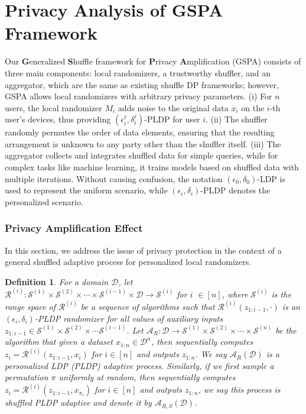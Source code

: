 \documentclass[letterpaper]{article} %
\newtheorem{definition}{Definition}
\begin{document}
\section{Privacy Analysis of GSPA Framework}
Our {\bf G}eneralized {\bf S}huffle framework for {\bf P}rivacy {\bf A}mplification (GSPA)
consists of three main components: local randomizers, a trustworthy shuffler, and an aggregator, which are the same as existing shuffle DP frameworks; however, GSPA allows local randomizers with arbitrary privacy parameters.
(i) For $n$ users, the local randomizer $M_i$ adds noise to the original data $x_i$ on the $i$-th user's devices, thus providing $(\epsilon^\ell_i,\delta^\ell_i)$-PLDP for user $i$. (ii) The shuffler randomly permutes the order of data elements, ensuring that the resulting arrangement is unknown to any party other than the shuffler itself. (iii) The aggregator collects and integrates shuffled data for simple queries, while for complex tasks like machine learning, it trains models based on shuffled data with multiple iterations.
Without causing confusion, the notation $(\epsilon_0, \delta_0)$-LDP is used to represent the uniform scenario, while $(\epsilon_i, \delta_i)$-PLDP denotes the personalized scenario.
\subsubsection*{Privacy Amplification Effect}
In this section, we address the issue of privacy protection in the context of a general shuffled adaptive process for personalized local randomizers.
\begin{definition}
For a domain $\mathcal{D}$, let $\mathcal{R}^{(i)}:\mathcal{S}^{(1)}\times \mathcal{S}^{(2)} \times \cdots \times \mathcal{S}^{(i-1)} \times \mathcal{D} \rightarrow \mathcal{S}^{(i)}$ for $i$ $\in [n]$, where $\mathcal{S}^{(i)}$ is the range space of $\mathcal{R}^{(i)}$ be a sequence of algorithms such that $\mathcal{R}^{(i)}(z_{1:i-1},\cdot)$ is an $(\epsilon_i,\delta_i)$-PLDP randomizer for all values of auxiliary inputs $z_{1:i-1} \in \mathcal{S}^{(1)} \times \mathcal{S}^{(2)} \times \cdots \mathcal{S}^{(i-1)}$. Let $\mathcal{A}_R: \mathcal{D} \rightarrow \mathcal{S}^{(1)} \times \mathcal{S}^{(2)} \times \cdots \times \mathcal{S}^{(n)}$ be the algorithm that given a dataset $x_{1:n} \in \mathcal{D}^n$, then sequentially computes $z_i = \mathcal{R}^{(i)}(z_{1:i-1},x_i)$ for $i \in [n]$ and outputs $z_{1:n}$. We say $\mathcal{A}_R(\mathcal{D})$ is a personalized LDP (PLDP) adaptive process. Similarly, if we first sample a permutation $\pi$ uniformly at random, then sequentially computes $z_i = \mathcal{R}^{(i)}(z_{1:i-1},x_{\pi_i})$ for $i \in [n]$ and outputs $z_{1:n}$, we say this process is shuffled PLDP adaptive and denote it by $\mathcal{A}_{R,S}(\mathcal{D})$.
\end{definition}
\end{document}
